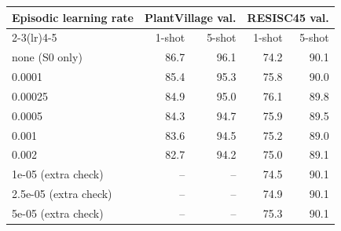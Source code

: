 \begin{tabular}{@{}lrrrr@{}}
\toprule
Episodic learning rate & \multicolumn{2}{c}{PlantVillage val.} & \multicolumn{2}{c}{RESISC45 val.} \\
\cmidrule(lr){2-3}\cmidrule(lr){4-5}
 & 1-shot & 5-shot & 1-shot & 5-shot \\
\midrule
none (S0 only) & 86.7 & 96.1 & 74.2 & 90.1 \\
0.0001 & 85.4 & 95.3 & 75.8 & 90.0 \\
0.00025 & 84.9 & 95.0 & 76.1 & 89.8 \\
0.0005 & 84.3 & 94.7 & 75.9 & 89.5 \\
0.001 & 83.6 & 94.5 & 75.2 & 89.0 \\
0.002 & 82.7 & 94.2 & 75.0 & 89.1 \\
\midrule
1e-05 (extra check) & -- & -- & 74.5 & 90.1 \\
2.5e-05 (extra check) & -- & -- & 74.9 & 90.1 \\
5e-05 (extra check) & -- & -- & 75.3 & 90.1 \\
\bottomrule
\end{tabular}